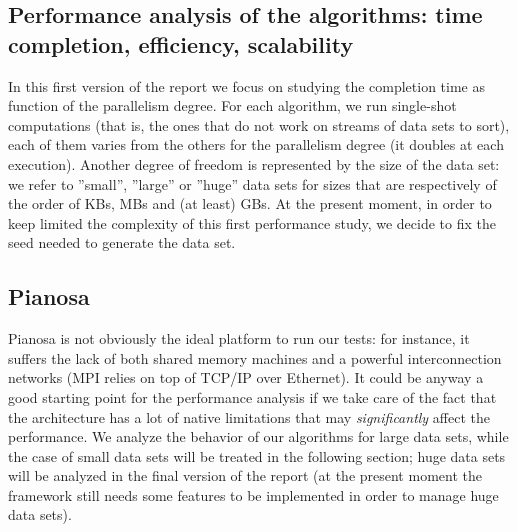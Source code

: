 \subsection{Performance analysis of the algorithms: time completion, efficiency, scalability}
In this first version of the report we focus on studying the completion time as function of the parallelism degree. For each algorithm, we run single-shot computations (that is, the ones that do not work on streams of data sets to sort), each of them varies from the others for the parallelism degree (it doubles at each execution). Another degree of freedom is represented by the size of the data set: we refer to ''small'', ''large'' or ''huge'' data sets for sizes that are respectively of the order of KBs, MBs and (at least) GBs. At the present moment, in order to keep limited the complexity of this first performance study, we decide to fix the seed needed to generate the data set.

\subsection*{Pianosa}
Pianosa is not obviously the ideal platform to run our tests: for instance, it suffers the lack of both shared memory machines and a powerful interconnection networks (MPI relies on top of TCP/IP over Ethernet). It could be anyway a good starting point for the performance analysis if we take care of the fact that the architecture has a lot of native limitations that may \textit{significantly} affect the performance. We analyze the behavior of our algorithms for large data sets, while the case of small data sets will be treated in the following section; huge data sets will be analyzed in the final version of the report (at the present moment the framework still needs some features to be implemented in order to manage huge data sets).

